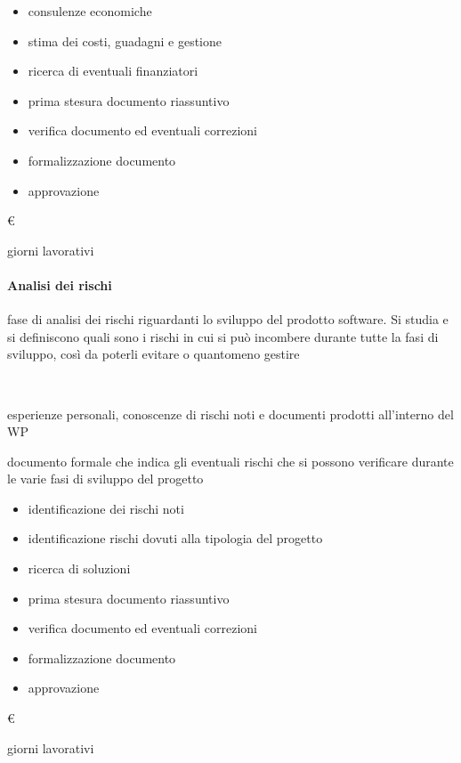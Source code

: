 \item[Attività:]
\begin{itemize}
\item consulenze economiche
\item stima dei costi, guadagni e gestione
\item ricerca di eventuali finanziatori
\item prima stesura documento riassuntivo
\item verifica documento ed eventuali correzioni
\item formalizzazione documento
\item approvazione
\end{itemize}
\item[Costo:] \euro \\
\item[Tempi di realizzazione:]  giorni lavorativi


\paragraph{Analisi dei rischi}

\item[Descrizione:] fase di analisi dei rischi riguardanti lo sviluppo del prodotto software. Si
studia e si definiscono quali sono i rischi in cui si può incombere durante tutte la fasi di
sviluppo, così da poterli evitare o quantomeno gestire\\

\item[Responsabile:] \\

\item[Input:] esperienze personali, conoscenze di rischi noti e documenti prodotti all’interno
del WP\\

\item[Output:] documento formale che indica gli eventuali rischi che si possono verificare
durante le varie fasi di sviluppo del progetto\\

\item[Attività:]
\begin{itemize}
\item identificazione dei rischi noti
\item identificazione rischi dovuti alla tipologia del progetto
\item ricerca di soluzioni
\item prima stesura documento riassuntivo
\item verifica documento ed eventuali correzioni
\item formalizzazione documento
\item approvazione
\end{itemize}
\item[Costo:] \euro \\
\item[Tempi di realizzazione:]  giorni lavorativi

